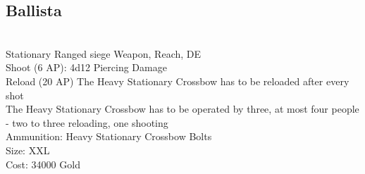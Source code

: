 \subsection{Ballista}\label{weapon:ballista}\\
Stationary Ranged siege Weapon,  Reach, DE\\
Shoot (6 AP): 4d12 Piercing Damage\\
Reload (20 AP) The Heavy Stationary Crossbow has to be reloaded after every shot\\
The Heavy Stationary Crossbow has to be operated by three, at most four people - two to three reloading, one shooting\\
Ammunition: Heavy Stationary Crossbow Bolts\\
Size: XXL\\
Cost: 34000 Gold\\